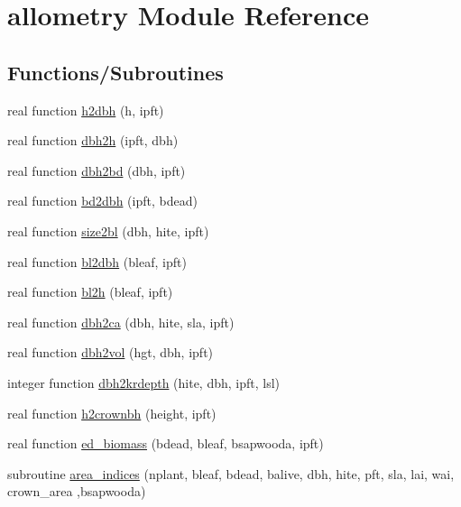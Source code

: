 \hypertarget{namespaceallometry}{}\section{allometry Module Reference}
\label{namespaceallometry}
\subsection*{Functions/\+Subroutines}
\begin{DoxyCompactItemize}
\item 
real function \hyperlink{namespaceallometry_a31aa8db06e86ec74efb5e692417399df}{h2dbh} (h, ipft)
\item 
real function \hyperlink{namespaceallometry_a56f11dc07da4d5e7114dc37d6cc5f2cc}{dbh2h} (ipft, dbh)
\item 
real function \hyperlink{namespaceallometry_a76db2bc4aaa47db1e2656117ec476dba}{dbh2bd} (dbh, ipft)
\item 
real function \hyperlink{namespaceallometry_a50fedbee3a14eb5569a62abb4a36198f}{bd2dbh} (ipft, bdead)
\item 
real function \hyperlink{namespaceallometry_a45ced9bf9ccd03debe8def35b579f4bd}{size2bl} (dbh, hite, ipft)
\item 
real function \hyperlink{namespaceallometry_a3236375dc165a26aeea2d97c7e2c2685}{bl2dbh} (bleaf, ipft)
\item 
real function \hyperlink{namespaceallometry_a59a1fc10140498dee62fce8a641da254}{bl2h} (bleaf, ipft)
\item 
real function \hyperlink{namespaceallometry_abacdf8e8e585ce8d788a1fc2be133243}{dbh2ca} (dbh, hite, sla, ipft)
\item 
real function \hyperlink{namespaceallometry_aab2b2cee61cac31529246b043121c7de}{dbh2vol} (hgt, dbh, ipft)
\item 
integer function \hyperlink{namespaceallometry_ac1523ea0e0ef8d2dd6a429f61a013c1c}{dbh2krdepth} (hite, dbh, ipft, lsl)
\item 
real function \hyperlink{namespaceallometry_a88949ed487fccc2f1dfd065399043b0d}{h2crownbh} (height, ipft)
\item 
real function \hyperlink{namespaceallometry_ab99b16f69dafaf5ff3e69c7514b9e7b6}{ed\+\_\+biomass} (bdead, bleaf, bsapwooda, ipft)
\item 
subroutine \hyperlink{namespaceallometry_af723dc0f45a94b8812583457c53d4308}{area\+\_\+indices} (nplant, bleaf, bdead, balive, dbh, hite, pft, sla, lai, wai, crown\+\_\+area                                                                                                           ,bsapwooda)
\end{DoxyCompactItemize}


